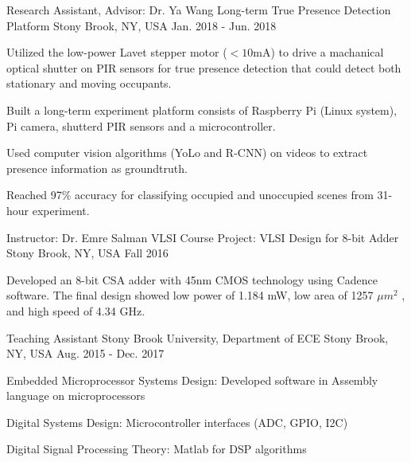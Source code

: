 \begin{cventries}
  \cventry
    {Research Assistant, Advisor: Dr. Ya Wang} %
    {Long-term True Presence Detection Platform} %
    {Stony Brook, NY, USA} %
    {Jan. 2018 - Jun. 2018} %
    {
      \begin{cvitems} %
        \item Utilized the low-power Lavet stepper motor ($<10$mA) to drive a machanical optical shutter on PIR 
        sensors for true presence detection that could detect both stationary and moving occupants.
        \item Built a long-term experiment platform consists of Raspberry Pi (Linux system), Pi camera, shutterd PIR sensors and a microcontroller.
        \item Used computer vision algorithms (YoLo and R-CNN) on videos to extract presence information as groundtruth.
        \item Reached 97\% accuracy for classifying occupied and unoccupied scenes from 31-hour experiment.
      \end{cvitems}
    }

    \cventry
    {Instructor: Dr. Emre Salman} %
    {VLSI Course Project: VLSI Design for 8-bit Adder} %
    {Stony Brook, NY, USA} %
    {Fall 2016} %
    {
      \begin{cvitems} %
        \item Developed an 8-bit CSA adder with 45nm CMOS technology using Cadence 
        software. The final design showed low power of
        1.184 mW, low area of 1257 \(\mu m^2\) , and high speed of 4.34 GHz.
      \end{cvitems}
    }

  \cventry
    {Teaching Assistant} %
    {Stony Brook University, Department of ECE} %
    {Stony Brook, NY, USA} %
    {Aug. 2015 - Dec. 2017} %
    {
      \begin{cvitems} %
        \item Embedded Microprocessor Systems Design: Developed software in Assembly language on microprocessors 
        \item Digital Systems Design: Microcontroller interfaces (ADC, GPIO, I2C)
        \item Digital Signal Processing Theory: Matlab for DSP algorithms
      \end{cvitems}
    }

\end{cventries}

